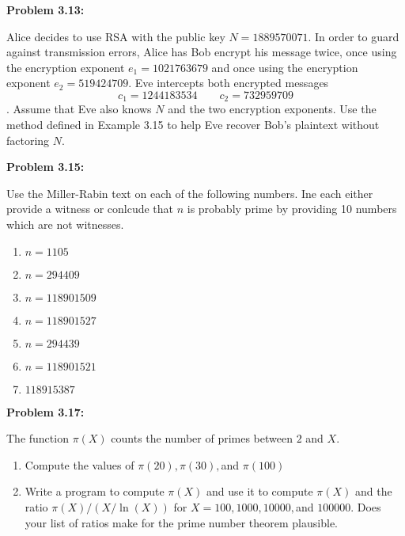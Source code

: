 \documentclass[a4paper, 11pt]{article}
\begin{document}
    
    
\noindent\textbf{Problem 3.13:}
    
    Alice decides to use RSA with the public key $N=1889570071$. In order to guard against transmission errors, Alice has Bob encrypt his message twice, once using the encryption exponent $e_1=1021763679$ and once using the encryption exponent $e_2=519424709$. Eve intercepts both encrypted messages $$c_1=1244183534 \qquad c_2=732959709$$.
    Assume that Eve also knows $N$ and the two encryption exponents. Use the method defined in Example 3.15 to help Eve recover Bob's plaintext without factoring $N$. 
    
    
    
\noindent\textbf{Problem 3.15:}
    
    Use the Miller-Rabin text on each of the following numbers. Ine each either provide a witness or conlcude that $n$ is probably prime by providing 10 numbers which are not witnesses.
    \begin{enumerate}[label=(\alph*)]
        \item $n=1105$
        \item $n=294409$
        \item $n=118901509$
        \item $n=118901527$
        \item $n=294439$
        \item $n=118901521$
        \item $118915387$
    \end{enumerate}
    
    
    
\noindent\textbf{Problem 3.17:}
    
    The function $\pi(X)$ counts the number of primes between $2$ and $X$.
    \begin{enumerate}[label=(\alph*)]
        \item Compute the values of $\pi(20),\pi(30),$and $\pi(100)$
        \item Write a program to compute $\pi(X)$ and use it to compute $\pi(X)$ and the ratio $\pi(X)/(X/\ln(X))$ for $X = 100, 1000, 10000,$and $100000$. Does your list of ratios make for the prime number theorem plausible.
    \end{enumerate}
    
    
    
\end{document}
